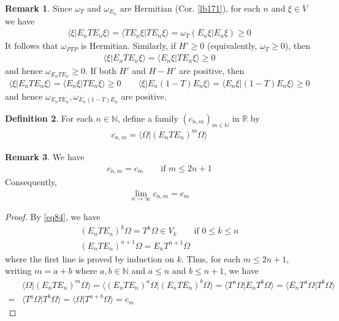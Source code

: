 \documentclass[12pt,b5paper,notitlepage]{article}
\theoremstyle{definition}
\newtheorem{df}{Definition}[subsection]
\newtheorem{rem}[df]{Remark}
\theoremstyle{plain}
\newcommand{\bk}[1]{\langle {#1}\rangle}
\newcommand{\Nbb}{\mathbb N}
\newcommand{\Rbb}{\mathbb R}
\numberwithin{equation}{section}
\begin{document}
\begin{rem}\label{lb173}
Since $\omega_T$ and $\omega_{E_n}$ are Hermitian (Cor. \ref{lb171}), for each $n$ and $\xi\in V$ we have
\begin{align*}
\bk{\xi|E_nTE_n\xi}=\bk{TE_n\xi|TE_n\xi}=\omega_T(E_n\xi|E_n\xi)\geq0
\end{align*}
It follows that $\omega_{PTP}$ is Hermitian. Similarly, if $H'\geq0$ (equivalently, $\omega_T\geq0$), then
\begin{align*}
\bk{\xi|E_nTE_n\xi}=\bk{E_n\xi|TE_n\xi}\geq0
\end{align*}
and hence $\omega_{E_nTE_n}\geq0$. If both $H'$ and $H-H'$ are positive, then 
\begin{align*}
\bk{\xi|E_nTE_n\xi}=\bk{E_n\xi|TE_n\xi}\geq0\qquad\bk{\xi|E_n(1-T)E_n\xi}=\bk{E_n\xi|(1-T)E_n\xi}\geq0
\end{align*}
and hence $\omega_{E_nTE_n},\omega_{E_n(1-T)E_n}$ are positive.
\end{rem}


\begin{df}
For each $n\in\Nbb$, define a family $(c_{n,m})_{m\in\Nbb}$ in $\Rbb$ by
\begin{align}
c_{n,m}=\bk{\Omega|(E_nTE_n)^m\Omega}
\end{align}
\end{df}

\begin{rem}\label{lb185}
We have
\begin{align}\label{eq83}
c_{n,m}=c_m\qquad\text{if }m\leq 2n+1
\end{align}
Consequently,
\begin{align}\label{eq90}
\lim_{n\rightarrow\infty}c_{n,m}=c_m
\end{align}
\end{rem}

\begin{proof}
By \eqref{eq84}, we have 
\begin{subequations}\label{eq102}
\begin{gather}
(E_nTE_n)^k\Omega=T^k\Omega\in V_k\qquad \text{if }0\leq k\leq n\\
(E_nTE_n)^{n+1}\Omega=E_nT^{n+1}\Omega
\end{gather}
\end{subequations}
where the first line is proved by induction on $k$. Thus, for each $m\leq 2n+1$, writing $m=a+b$ where $a,b\in\Nbb$ and $a\leq n$ and $b\leq n+1$, we have
\begin{align*}
&\bk{\Omega|(E_nTE_n)^m\Omega}=\bk{(E_nTE_n)^a\Omega|(E_nTE_n)^b\Omega}=\bk{T^a\Omega|E_nT^b\Omega}=\bk{E_nT^a\Omega|T^b\Omega}\\
=&\bk{T^a\Omega|T^b\Omega}=\bk{\Omega|T^{a+b}\Omega}=c_m
\end{align*}
\end{proof}
\end{document}
